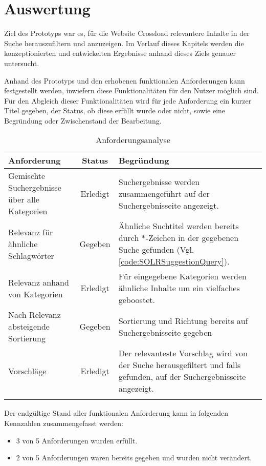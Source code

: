 \chapter{Auswertung}
\label{ch:evaluation}
Ziel des Prototyps war es, für die Website Crossload relevantere Inhalte in der Suche herauszufiltern und anzuzeigen.
Im Verlauf dieses Kapitels werden die konzeptionierten und entwickelten Ergebnisse anhand dieses Ziels genauer untersucht.

Anhand des Prototyps und den erhobenen funktionalen Anforderungen kann festgestellt werden, inwiefern diese Funktionalitäten für den Nutzer möglich sind.
Für den Abgleich dieser Funktionalitäten wird für jede Anforderung ein kurzer Titel gegeben, der Status, ob diese erfüllt wurde oder nicht, sowie eine Begründung oder Zwischenstand der Bearbeitung.

\begin{longtable}{p{}|c|p{}}
  \label{tab:requirements}\\
  \textbf{Anforderung} & \textbf{Status} & \textbf{Begründung} \\
  \hline
  \hline
  Gemischte Suchergebnisse über alle Kategorien & Erledigt & Suchergebnisse werden zusammengeführt auf der Suchergebnisseite angezeigt. \\
  \hline

  Relevanz für ähnliche Schlagwörter & Gegeben & Ähnliche Suchtitel werden bereits durch *-Zeichen in der gegebenen Suche gefunden (Vgl. \ref{code:SOLRSuggestionQuery}). \\
  \hline

  Relevanz anhand von Kategorien & Erledigt & Für eingegebene Kategorien werden ähnliche Inhalte um ein vielfaches geboostet. \\
  \hline

  Nach Relevanz absteigende Sortierung & Gegeben & Sortierung und Richtung bereits auf Suchergebnisseite gegeben \\
  \hline

  Vorschläge & Erledigt & Der relevanteste Vorschlag wird von der Suche herausgefiltert und falls gefunden, auf der Suchergebnisseite angezeigt. \\
  \caption{Anforderungsanalyse}
\end{longtable}

Der endgültige Stand aller funktionalen Anforderung kann in folgenden Kennzahlen zusammengefasst werden:
\begin{itemize}
  \item 3 von 5 Anforderungen wurden erfüllt.
  \item 2 von 5 Anforderungen waren bereits gegeben und wurden nicht verändert.
\end{itemize}
